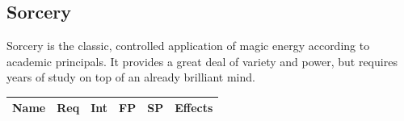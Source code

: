 \documentclass[12pt]{article}
\begin{document}
\pagebreak

\subsection{Sorcery}
Sorcery is the classic, controlled application of magic energy according to academic principals. It provides a great deal of variety and power, but requires years of study on top of an already brilliant mind.
\begin{center}
\begin{tabularx}{\textwidth}{p{}p{}p{}p{}p{}p{}}
\hline
\rowcolor{white} \textbf{Name} & \textbf{Req} & \textbf{Int} & \textbf{FP} & \textbf{SP} & \textbf{Effects}\setcounter{rownum}{0}\\
\hline


\end{tabularx}
\end{center}
\end{document}
